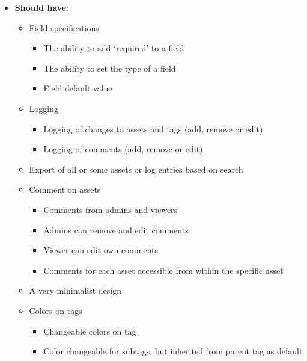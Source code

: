 \begin{itemize}
    \item \textbf{Should have}:
        \begin{itemize}
            \item Field specifications
            \begin{itemize}
                \item The ability to add ‘required’ to a field
                \item The ability to set the type of a field
                \item Field default value
            \end{itemize}
            \item Logging
            \begin{itemize}
                \item Logging of changes to assets and tags (add, remove or edit)
                \item Logging of comments (add, remove or edit)
            \end{itemize}
            \item Export of all or some assets or log entries based on search
            \item Comment on assets
            \begin{itemize}
                \item Comments from admins and viewers
                \item Admins can remove and edit comments
                \item Viewer can edit own comments
                \item Comments for each asset accessible from within the specific asset %
            \end{itemize}
            \item A very minimalist design
            \item Colors on tags
                \begin{itemize}
                    \item Changeable colors on tag
                    \item Color changeable for subtags, but inherited from parent tag as default
                \end{itemize}
        \end{itemize}
        

\end{itemize}
